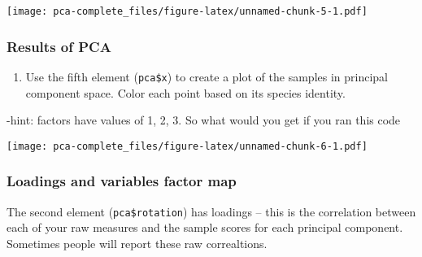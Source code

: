 \documentclass[]{article}
\newenvironment{Shaded}{\begin{snugshade}}{\end{snugshade}}
\newcommand{\DataTypeTok}[1]{\textcolor[rgb]{0.13,0.29,0.53}{#1}}
\newcommand{\DecValTok}[1]{\textcolor[rgb]{0.00,0.00,0.81}{#1}}
\newcommand{\KeywordTok}[1]{\textcolor[rgb]{0.13,0.29,0.53}{\textbf{#1}}}
\newcommand{\NormalTok}[1]{#1}
\newcommand{\OperatorTok}[1]{\textcolor[rgb]{0.81,0.36,0.00}{\textbf{#1}}}
\newcommand{\StringTok}[1]{\textcolor[rgb]{0.31,0.60,0.02}{#1}}
\providecommand{\tightlist}{%
  \setlength{\itemsep}{0pt}\setlength{\parskip}{0pt}}
\begin{document}
\texttt{[image: pca-complete\_files/figure-latex/unnamed-chunk-5-1.pdf]}

\hypertarget{results-of-pca}{%
\subsubsection{Results of PCA}\label{results-of-pca}}

\begin{enumerate}
\def\labelenumi{\arabic{enumi})}
\setcounter{enumi}{4}
\tightlist
\item
  Use the fifth element (\texttt{pca\$x}) to create a plot of the
  samples in principal component space. Color each point based on its
  species identity.
\end{enumerate}

-hint: factors have values of 1, 2, 3. So what would you get if you ran
this code

\begin{Shaded}
\end{Shaded}

\texttt{[image: pca-complete\_files/figure-latex/unnamed-chunk-6-1.pdf]}

\hypertarget{loadings-and-variables-factor-map}{%
\subsubsection{Loadings and variables factor
map}\label{loadings-and-variables-factor-map}}

The second element (\texttt{pca\$rotation}) has loadings -- this is the
correlation between each of your raw measures and the sample scores for
each principal component. Sometimes people will report these raw
correaltions.

\begin{Shaded}
\end{Shaded}
\end{document}
